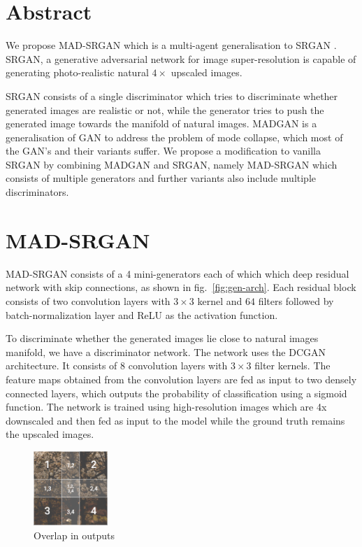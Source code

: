 \documentclass[12pt,a4paper]{article}
\begin{document}
    \begin{multicols}{2}
        \section{Abstract}
            We propose MAD-SRGAN which is a multi-agent generalisation to SRGAN \cite{srgan}.
            SRGAN, a generative adversarial network \cite{gan} for image super-resolution is capable of generating photo-realistic natural $4\times$ upscaled images.

            SRGAN consists of a single discriminator which tries to discriminate whether generated images are realistic or not, while the generator tries to push the generated image towards the manifold of natural images.
            MADGAN \cite{madgan} is a generalisation of GAN to address the problem of mode collapse, which most of the GAN's and their variants suffer.
            We propose a modification to vanilla SRGAN by combining MADGAN and SRGAN, namely MAD-SRGAN which consists of multiple generators and further variants also include multiple discriminators.

        \section{MAD-SRGAN}
            MAD-SRGAN consists of a 4 mini-generators each of which which deep residual network \cite{resnet} with skip connections, as shown in fig.~\ref{fig:gen-arch}.
            Each residual block consists of two convolution layers with $3\times3$ kernel and $64$ filters followed by batch-normalization \cite{batch-norm} layer and ReLU as the activation function.

            To discriminate whether the generated images lie close to natural images manifold, we have a discriminator network.
            The network uses the DCGAN \cite{dcgan} architecture.
            It consists of 8 convolution layers with $3\times3$ filter kernels.
            The feature maps obtained from the convolution layers are fed as input to two densely connected layers, which outputs the probability of classification using a sigmoid function.
            The network is trained using high-resolution images which are 4x downscaled and then fed as input to the model while the ground truth remains the upscaled images.

            \begin{figure}[H]
                \centering
                \includegraphics[width=0.25\textwidth]{images/overlap.png}
                \caption{Overlap in outputs}
                \label{fig:overlap}
            \end{figure}


\end{multicols}
\end{document}
